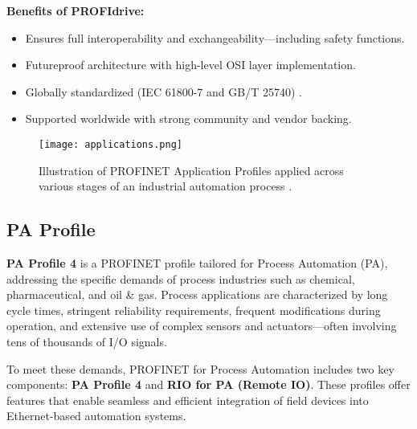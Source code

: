 \documentclass[conference]{IEEEtran}
\begin{document}
\textbf{Benefits of PROFIdrive:}
\begin{itemize}
    \item Ensures full interoperability and exchangeability—including safety functions.
    \item Futureproof architecture with high-level OSI layer implementation.
    \item Globally standardized (IEC 61800-7 and GB/T 25740) \cite{profinet_profidrive}.
    \item Supported worldwide with strong community and vendor backing.
\end{itemize}

\begin{figure}[H]
    \centering
    \texttt{[image: applications.png]}
    \caption{Illustration of PROFINET Application Profiles applied across various stages of an industrial automation process \cite{profinetProfiles}.}
    \label{fig:profinet_profiles}
\end{figure}


\subsection{PA Profile }
\label{subsec: pAProfile}
\textbf{PA Profile 4} is a PROFINET profile tailored for Process Automation (PA), addressing the specific demands of process industries such as chemical, pharmaceutical, and oil \& gas. Process applications are characterized by long cycle times, stringent reliability requirements, frequent modifications during operation, and extensive use of complex sensors and actuators—often involving tens of thousands of I/O signals.

To meet these demands, PROFINET for Process Automation includes two key components: \textbf{PA Profile 4} and \textbf{RIO for PA (Remote IO)}. These profiles offer features that enable seamless and efficient integration of field devices into Ethernet-based automation systems.
\end{document}
